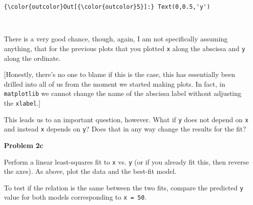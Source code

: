\documentclass[11pt]{article}
\begin{document}
\begin{Verbatim}[commandchars=\\\{\}]
{\color{outcolor}Out[{\color{outcolor}5}]:} Text(0,0.5,'y')
\end{Verbatim}
            
    \begin{center}
    \end{center}
    { \hspace*{\fill} \\}
    
    There is a very good chance, though, again, I am not specifically
assuming anything, that for the previous plots that you plotted
\texttt{x} along the abscissa and \texttt{y} along the ordinate.

{[}Honestly, there's no one to blame if this is the case, this has
essentially been drilled into all of us from the moment we started
making plots. In fact, in \texttt{matplotlib} we cannot change the name
of the abscissa label without adjusting the \texttt{xlabel}.{]}

    This leads us to an important question, however. What if \texttt{y} does
not depend on \texttt{x} and instead \texttt{x} depends on \texttt{y}?
Does that in any way change the results for the fit?

    \textbf{Problem 2c}

Perform a linear least-squares fit to \texttt{x} vs. \texttt{y} (or if
you already fit this, then reverse the axes). As above, plot the data
and the best-fit model.

To test if the relation is the same between the two fits, compare the
predicted \texttt{y} value for both models corresponding to
\texttt{x\ =\ 50}.
\end{document}
